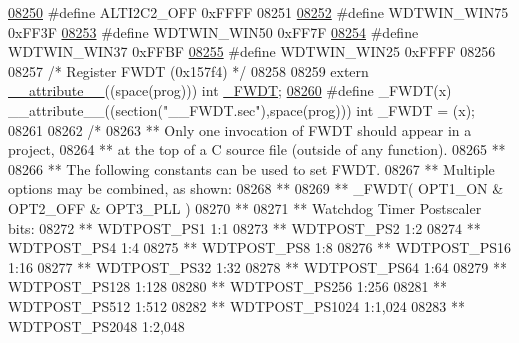 \begin{DoxyCode}
{{{{\hypertarget{a00015_source_l08250}{}\hyperlink{a00015_a1fe2caf7e8cd77c1d19b700df4a5e724}{08250} \textcolor{preprocessor}{#define ALTI2C2\_OFF          0xFFFF}
08251 
\hypertarget{a00015_source_l08252}{}\hyperlink{a00015_a4b276e454c507f1ded7aba45063533ea}{08252} \textcolor{preprocessor}{#define WDTWIN\_WIN75         0xFF3F}
\hypertarget{a00015_source_l08253}{}\hyperlink{a00015_ab58c947ebb61320f04a8f3546b653c91}{08253} \textcolor{preprocessor}{#define WDTWIN\_WIN50         0xFF7F}
\hypertarget{a00015_source_l08254}{}\hyperlink{a00015_a23457be4f3434583f273e6c1e8dce8f1}{08254} \textcolor{preprocessor}{#define WDTWIN\_WIN37         0xFFBF}
\hypertarget{a00015_source_l08255}{}\hyperlink{a00015_a5dfbcf59299b0e595eed8212caf8159c}{08255} \textcolor{preprocessor}{#define WDTWIN\_WIN25         0xFFFF}
08256 
08257 \textcolor{comment}{/* Register FWDT (0x157f4)                               */}
08258 
08259 \textcolor{keyword}{extern} \hyperlink{a00015_a493c46f03454991ccc5aa7a6e1dfb2a7}{\_\_attribute\_\_}((space(prog))) int \hyperlink{a00015_af24dea78c3111674d8bd9d621f1023ad}{\_FWDT};
\hypertarget{a00015_source_l08260}{}\hyperlink{a00015_af24dea78c3111674d8bd9d621f1023ad}{08260} \textcolor{preprocessor}{#define \_FWDT(x) \_\_attribute\_\_((section("\_\_FWDT.sec"),space(prog))) int \_FWDT = (x);}
08261 
08262 \textcolor{comment}{/*}
08263 \textcolor{comment}{** Only one invocation of FWDT should appear in a project,}
08264 \textcolor{comment}{** at the top of a C source file (outside of any function).}
08265 \textcolor{comment}{**}
08266 \textcolor{comment}{** The following constants can be used to set FWDT.}
08267 \textcolor{comment}{** Multiple options may be combined, as shown:}
08268 \textcolor{comment}{**}
08269 \textcolor{comment}{** \_FWDT( OPT1\_ON & OPT2\_OFF & OPT3\_PLL )}
08270 \textcolor{comment}{**}
08271 \textcolor{comment}{**   Watchdog Timer Postscaler bits:}
08272 \textcolor{comment}{**     WDTPOST\_PS1          1:1}
08273 \textcolor{comment}{**     WDTPOST\_PS2          1:2}
08274 \textcolor{comment}{**     WDTPOST\_PS4          1:4}
08275 \textcolor{comment}{**     WDTPOST\_PS8          1:8}
08276 \textcolor{comment}{**     WDTPOST\_PS16         1:16}
08277 \textcolor{comment}{**     WDTPOST\_PS32         1:32}
08278 \textcolor{comment}{**     WDTPOST\_PS64         1:64}
08279 \textcolor{comment}{**     WDTPOST\_PS128        1:128}
08280 \textcolor{comment}{**     WDTPOST\_PS256        1:256}
08281 \textcolor{comment}{**     WDTPOST\_PS512        1:512}
08282 \textcolor{comment}{**     WDTPOST\_PS1024       1:1,024}
08283 \textcolor{comment}{**     WDTPOST\_PS2048       1:2,048}
}}}}
\end{DoxyCode}
